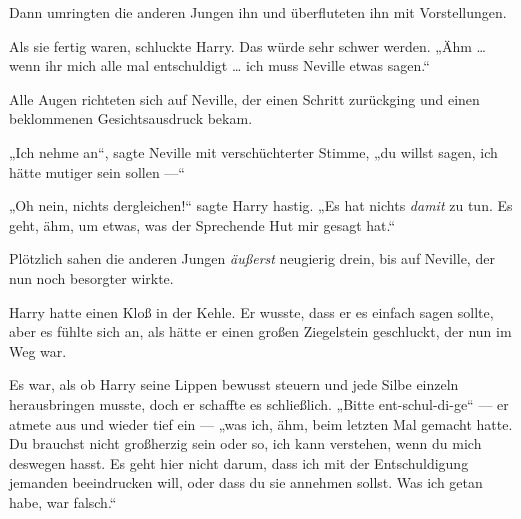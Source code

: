 Dann umringten die anderen Jungen ihn und überfluteten ihn mit Vorstellungen.

Als sie fertig waren, schluckte Harry. Das würde sehr schwer werden. „Ähm … wenn ihr mich alle mal entschuldigt … ich muss Neville etwas sagen.“

Alle Augen richteten sich auf Neville, der einen Schritt zurückging und einen beklommenen Gesichtsausdruck bekam.

„Ich nehme an“, sagte Neville mit verschüchterter Stimme, „du willst sagen, ich hätte mutiger sein sollen —“

„Oh nein, nichts dergleichen!“ sagte Harry hastig.
„Es hat nichts \emph{damit} zu tun. Es geht, ähm, um etwas, was der Sprechende Hut mir gesagt hat.“

Plötzlich sahen die anderen Jungen \emph{äußerst} neugierig drein, bis auf Neville, der nun noch besorgter wirkte.

Harry hatte einen Kloß in der Kehle. Er wusste, dass er es einfach sagen sollte, aber es fühlte sich an, als hätte er einen großen Ziegelstein geschluckt, der nun im Weg war.

Es war, als ob Harry seine Lippen bewusst steuern und jede Silbe einzeln herausbringen musste, doch er schaffte es schließlich.
„Bitte ent-schul-di-ge“ — er atmete aus und wieder tief ein — „was ich, ähm, beim letzten Mal gemacht hatte. Du brauchst nicht großherzig sein oder so, ich kann verstehen, wenn du mich deswegen hasst. Es geht hier nicht darum, dass ich mit der Entschuldigung jemanden beeindrucken will, oder dass du sie annehmen sollst. Was ich getan habe, war falsch.“

